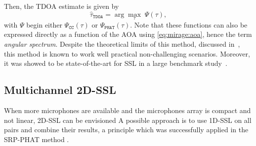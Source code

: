 \mynewline
Then, the \ac{TDOA} estimate is given by
\begin{equation*}
    \hat{\tau}_\mathtt{TDOA} = \arg \underset{\tau}{\max} \; \Psi(\tau)
    ,
\end{equation*}
with $\Psi$ begin either $\Psi_\mathtt{CC}(\tau)$ or $\Psi_\mathtt{PHAT}(\tau)$.
Note that these functions can also be expressed directly as a function of the \ac{AOA} using \eqref{eq:mirage:aoa}, hence the term \textit{angular spectrum}.
Despite the theoretical limits of this method, discussed in~, this method is known to work well practical non-challenging scenarios.
Moreover, it was showed to be state-of-the-art for \ac{SSL} in a large benchmark study~.

\subsection{Multichannel 2D-SSL}\label{subsec:mirage:2D-SSL}
When more microphones are available and the microphones array is compact and not linear, 2D-\ac{SSL} can be envisioned
A possible approach is to use 1D-\ac{SSL} on all pairs and combine their results, a principle which was successfully applied in the \acf{SRP-PHAT} method .


